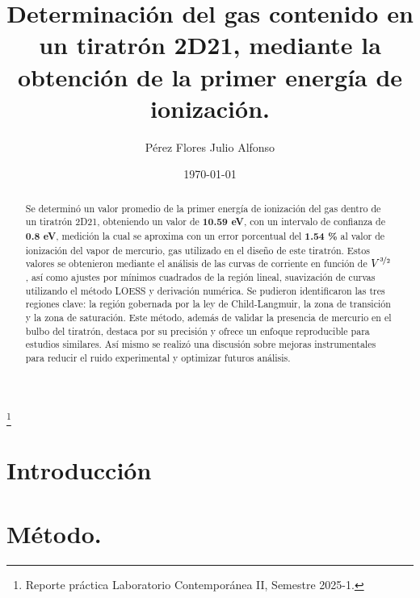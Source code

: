 \documentclass[letterpaper,spanish,reprint,nofootinbib,showkeys,aps]{revtex4-2}
\newcommand{\ut}[1]{\textbf{#1}} %
\begin{document}
\allowdisplaybreaks

\title{Determinación del gas contenido en un tiratrón 2D21, mediante la obtención de la primer energía de ionización.}

\author{ Pérez Flores Julio Alfonso}

\thanks{Reporte práctica Laboratorio Contemporánea II, Semestre 2025-1.}

\date{\today}


\begin{abstract}

Se determinó un valor promedio de la primer energía de ionización del gas dentro de un tiratrón 2D21, obteniendo un valor de \ut{10.59 eV}, con un intervalo de confianza de \ut{0.8 eV}, medición la cual se aproxima con un error porcentual del \ut{1.54 \%} al valor de ionización del vapor de mercurio, gas utilizado en el diseño de este tiratrón. Estos valores se  obtenieron mediante el análisis de las curvas de corriente en función de $V^{\nicefrac{3}{2}}$, así como ajustes por mínimos cuadrados de la región lineal, suavización de curvas utilizando el método LOESS y derivación numérica. Se pudieron identificaron las tres regiones clave: la región gobernada por la ley de Child-Langmuir, la zona de transición y la zona de saturación. Este método, además de validar la presencia de mercurio en el bulbo del tiratrón, destaca por su precisión y ofrece un enfoque reproducible para estudios similares. Así mismo se realizó una discusión sobre mejoras instrumentales para reducir el ruido experimental y optimizar futuros análisis. 
 
\end{abstract}



\maketitle


\section{ Introducción}\label{sec:introduccion}



\section{Método.}\label{sec:metodo}
\end{document}
